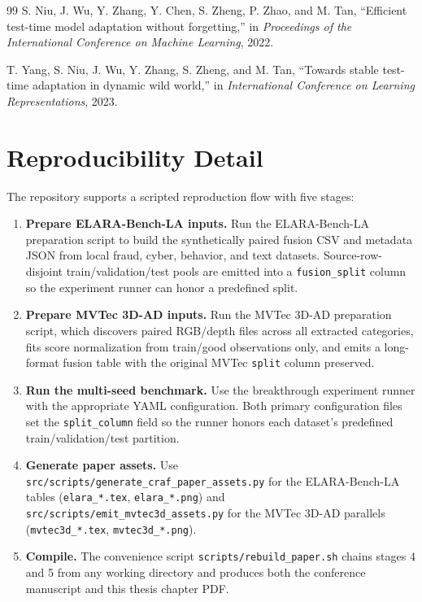 \documentclass[11pt]{article}
\newcommand{\benchmark}{ELARA-Bench-LA}
\begin{document}
\begin{thebibliography}{99}
S. Niu, J. Wu, Y. Zhang, Y. Chen, S. Zheng, P. Zhao, and M. Tan,
``Efficient test-time model adaptation without forgetting,'' in
\emph{Proceedings of the International Conference on Machine Learning},
2022.

T. Yang, S. Niu, J. Wu, Y. Zhang, S. Zheng, and M. Tan, ``Towards
stable test-time adaptation in dynamic wild world,'' in
\emph{International Conference on Learning Representations}, 2023.

\end{thebibliography}

\appendix

\section{Reproducibility Detail}
\label{app:reproducibility}

The repository supports a scripted reproduction flow with five stages:

\begin{enumerate}
  \item \textbf{Prepare \benchmark{} inputs.} Run the
  \benchmark{} preparation script to build the
  synthetically paired fusion CSV and metadata JSON from local fraud, cyber,
  behavior, and text datasets. Source-row-disjoint train/validation/test
  pools are emitted into a \texttt{fusion\_split} column so the
  experiment runner can honor a predefined split.
  \item \textbf{Prepare MVTec 3D-AD inputs.} Run the MVTec 3D-AD
  preparation script, which
  discovers paired RGB/depth files across all extracted categories,
  fits score normalization from train/good observations only, and
  emits a long-format fusion table with the original MVTec
  \texttt{split} column preserved.
  \item \textbf{Run the multi-seed benchmark.} Use the breakthrough
  experiment runner with the
  appropriate YAML configuration. Both primary configuration files set the
  \texttt{split\_column} field so the runner honors each dataset's
  predefined train/validation/test partition.
  \item \textbf{Generate paper assets.} Use
  \texttt{src/scripts/generate\_craf\_paper\_assets.py} for the
  \benchmark{} tables (\texttt{elara\_*.tex}, \texttt{elara\_*.png}) and
  \texttt{src/scripts/emit\_mvtec3d\_assets.py} for the MVTec 3D-AD
  parallels (\texttt{mvtec3d\_*.tex}, \texttt{mvtec3d\_*.png}).
  \item \textbf{Compile.} The convenience script
  \texttt{scripts/rebuild\_paper.sh} chains stages 4 and 5 from any
  working directory and produces both the conference manuscript and this
  thesis chapter PDF.
\end{enumerate}
\end{document}

